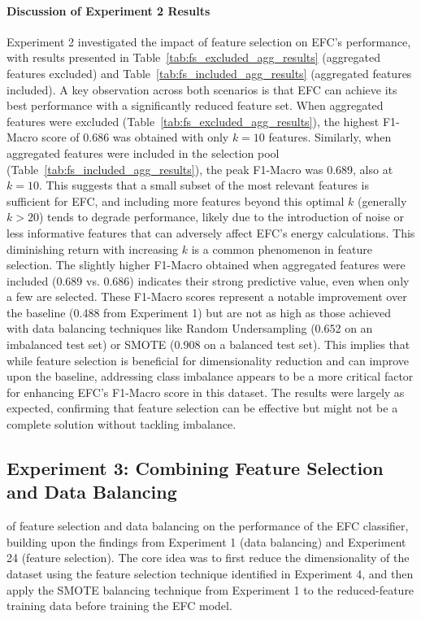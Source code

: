 \documentclass[12pt]{article}
\begin{document}
\paragraph{Discussion of Experiment 2 Results}
Experiment 2 investigated the impact of feature selection on EFC's performance, with results presented in
Table~\ref{tab:fs_excluded_agg_results} (aggregated features excluded) and Table~\ref{tab:fs_included_agg_results}
(aggregated features included). A key observation across both scenarios is that EFC can achieve its best performance with
a significantly reduced feature set. When aggregated features were excluded (Table~\ref{tab:fs_excluded_agg_results}),
the highest F1-Macro score of 0.686 was obtained with only $k=10$ features. Similarly, when aggregated features were
included in the selection pool (Table~\ref{tab:fs_included_agg_results}), the peak F1-Macro was 0.689, also at $k=10$.
This suggests that a small subset of the most relevant features is sufficient for EFC, and including more features beyond
this optimal $k$ (generally $k>20$) tends to degrade performance, likely due to the introduction of noise or less
informative features that can adversely affect EFC's energy calculations. This diminishing return with increasing $k$ is
a common phenomenon in feature selection. The slightly higher F1-Macro obtained when aggregated features were included
(0.689 vs. 0.686) indicates their strong predictive value, even when only a few are selected. These F1-Macro scores represent
a notable improvement over the baseline (0.488 from Experiment 1) but are not as high as those achieved with data balancing
techniques like Random Undersampling (0.652 on an imbalanced test set) or SMOTE (0.908 on a balanced test set). This implies
that while feature selection is beneficial for dimensionality reduction and can improve upon the baseline, addressing
class imbalance appears to be a more critical factor for enhancing EFC's F1-Macro score in this dataset. The results were
largely as expected, confirming that feature selection can be effective but might not be a complete solution without tackling imbalance.

\subsection{Experiment 3: Combining Feature Selection and Data Balancing} \label{subsec:experiment_3}
of feature selection and data balancing on the performance of the EFC classifier, building upon the findings from
Experiment 1 (data balancing) and Experiment 24 (feature selection). The core idea was to first reduce the dimensionality
of the dataset using the feature selection technique identified in Experiment 4, and then apply the SMOTE balancing
technique from Experiment 1 to the reduced-feature training data before training the EFC model.
\end{document}
